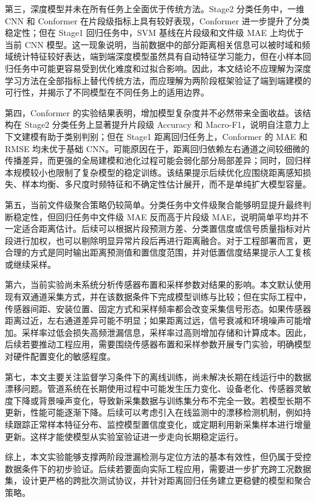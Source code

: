 第三，深度模型并未在所有任务上全面优于传统方法。Stage2 分类任务中，一维 CNN 和 Conformer 在片段级指标上具有较好表现，Conformer 进一步提升了分类稳定性；但在 Stage1 回归任务中，SVM 基线在片段级和文件级 MAE 上均优于当前 CNN 模型。这一现象说明，当前数据中的部分距离相关信息可以被时域和频域统计特征较好表达，端到端深度模型虽然具有自动特征学习能力，但在小样本回归任务中可能更容易受到优化难度和过拟合影响。因此，本文结论不应理解为深度学习方法在全部指标上替代传统方法，而应理解为两阶段框架验证了端到端建模的可行性，并揭示了不同模型在不同任务上的适用边界。

第四，Conformer 的实验结果表明，增加模型复杂度并不必然带来全面收益。该结构在 Stage2 分类任务上显著提升片段级 Accuracy 和 Macro-F1，说明自注意力上下文建模有助于类别判别；但在 Stage1 距离回归任务上，Conformer 的 MAE 和 RMSE 均未优于基础 CNN。可能原因在于，距离回归依赖左右通道之间较细微的传播差异，而更强的全局建模和池化过程可能会弱化部分局部差异；同时，回归样本规模较小也限制了复杂模型的稳定训练。该结果提示后续优化应围绕距离感知损失、样本均衡、多尺度时频特征和不确定性估计展开，而不是单纯扩大模型容量。

第五，当前文件级聚合策略仍较简单。分类任务中文件级聚合能够明显提升最终判断稳定性，但回归任务中文件级 MAE 反而高于片段级 MAE，说明简单平均并不一定适合距离估计。后续可以根据片段预测方差、分类置信度或信号质量指标对片段进行加权，也可以剔除明显异常片段后再进行距离融合。对于工程部署而言，更合理的方式是同时输出距离预测值和置信度范围，并对低置信度结果提示人工复核或继续采样。

第六，当前实验尚未系统分析传感器布置和采样参数对结果的影响。本文默认使用现有双通道采集方式，并在该数据条件下完成模型训练与比较；但在实际工程中，传感器间距、安装位置、固定方式和采样频率都会改变采集信号形态。如果传感器距离过近，左右通道差异可能不明显；如果距离过远，信号衰减和环境噪声可能增加。采样率过低会损失高频泄漏信息，采样率过高则增加存储和计算成本。因此，后续若要推动工程应用，需要围绕传感器布置和采样参数开展专门实验，明确模型对硬件配置变化的敏感程度。

第七，本文主要关注监督学习条件下的离线训练，尚未解决长期在线运行中的数据漂移问题。管道系统在长期使用过程中可能发生压力变化、设备老化、传感器灵敏度下降或背景噪声变化，导致新采集数据与训练集分布不完全一致。若模型长期不更新，性能可能逐渐下降。后续可以考虑引入在线监测中的漂移检测机制，例如持续跟踪正常样本特征分布、监控模型置信度变化，或定期利用新采集样本进行增量更新。这样才能使模型从实验室验证进一步走向长期稳定运行。

综上，本文实验能够支撑两阶段泄漏检测与定位方法的基本有效性，但仍属于受控数据条件下的初步验证。后续若要面向实际工程应用，需要进一步扩充跨工况数据集，设计更严格的跨批次测试协议，并针对距离回归任务建立更稳健的模型和聚合策略。

